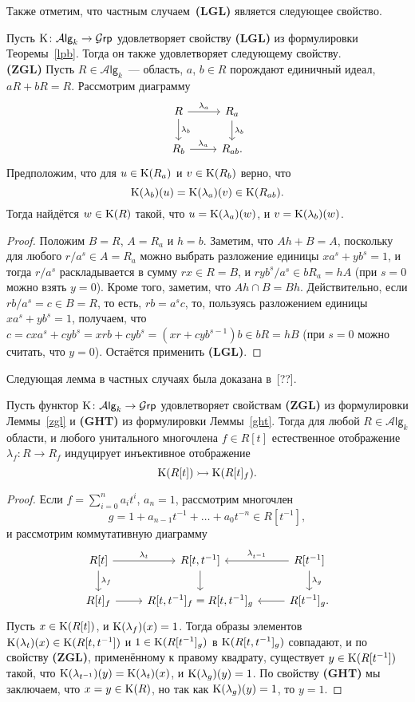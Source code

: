 \documentclass[oneside, 11pt]{amsart} \pdfoutput=1
\begin{document}
Также отметим, что частным случаем~{\bf(LGL)} является следующее свойство.
\begin{lemma}
\label{zgl}
Пусть ${\mathrm{K}}\colon\mathcal A\mathsf{lg}_k\rightarrow\mathcal G\mathsf{rp}$ удовлетворяет свойству {\bf(LGL)} из формулировки Теоремы~\ref{lpb}. Тогда он также удовлетворяет следующему свойству.\\
{\rm\bf(ZGL)}
Пусть $R\in\mathcal A\mathsf{lg}_k$~--- область, $a$, $b\in R$ порождают единичный идеал, $aR+bR=R$. Рассмотрим диаграмму
$$\begin{tikzcd}
R \ar{r}{\lambda_a} \ar{d}{\lambda_b} & R_a \ar{d}{\lambda_b}\\
R_b \ar{r}{\lambda_a} & R_{ab}.
\end{tikzcd}$$
Предположим, что для $u\in{\mathrm{K}}(R_a)$ и $v\in{\mathrm{K}}(R_b)$ верно, что $${\mathrm{K}}(\lambda_b)(u)={\mathrm{K}}(\lambda_a)(v)\in{\mathrm{K}}(R_{ab}).$$
Тогда найдётся $w\in{\mathrm{K}}(R)$ такой, что $u={\mathrm{K}}(\lambda_a)(w)$, и $v={\mathrm{K}}(\lambda_b)(w)$.
\end{lemma}
\begin{proof}
Положим $B=R$, $A=R_a$ и $h=b$. Заметим, что $Ah+B=A$, поскольку для любого $r/a^s\in A=R_a$ можно выбрать разложение единицы $xa^s+yb^s=1$, и тогда $r/a^s$ раскладывается в сумму $rx\in R=B$, и $ryb^s/a^s\in bR_a=hA$ (при $s=0$ можно взять $y=0$). Кроме того, заметим, что $Ah\cap B=Bh$. Действительно, если $rb/a^s=c\in B=R$, то есть, $rb=a^sc$, то, пользуясь разложением единицы $xa^s+yb^s=1$, получаем, что $c=cxa^s+cyb^s=xrb+cyb^s=(xr+cyb^{s-1})b\in bR=hB$ (при $s=0$ можно считать, что $y=0$). Остаётся применить {\bf(LGL)}.
\end{proof}

Следующая лемма в частных случаях была доказана в~[??].
\begin{lemma}
\label{lmp}
Пусть функтор ${\mathrm{K}}\colon\mathcal A\mathsf{lg}_k\rightarrow\mathcal G\mathsf{rp}$ удовлетворяет свойствам {\bf(ZGL)} из формулировки Леммы~\ref{zgl} и {\bf(GHT)} из формулировки Леммы~\ref{ght}. Тогда для любой $R\in\mathcal A\mathsf{lg}_k$ области, и любого унитального многочлена $f\in R[t]$ естественное отображение $\lambda_f\colon R\rightarrow R_f$ индуцирует инъективное отображение
$$
{\mathrm{K}}(R[t])\rightarrowtail{\mathrm{K}}(R[t]_f).
$$
\end{lemma}
\begin{proof}
Если $f=\sum_{i=0}^n a_it^i$, $a_n=1$, рассмотрим многочлен $$g=1+a_{n-1}t^{-1}+\ldots+a_0t^{-n}\in R[t^{-1}],$$ и рассмотрим коммутативную диаграмму
$$\begin{tikzcd}
R[t] \ar{r}{\lambda_t} \ar{d}{\lambda_f} & R[t, t^{-1}] \ar{d} & R[t^{-1}] \ar{l}[']{\lambda_{t^{-1}}} \ar{d}{\lambda_g}\\
R[t]_f \ar{r} & R[t, t^{-1}]_f = R[t, t^{-1}]_g & R[t^{-1}]_g. \ar{l}
\end{tikzcd}$$
Пусть $x\in{\mathrm{K}}(R[t])$, и ${\mathrm{K}}(\lambda_f)(x)=1$. Тогда образы элементов ${\mathrm{K}}(\lambda_t)(x)\in{\mathrm{K}}(R[t,t^{-1}])$ и $1\in{\mathrm{K}}(R[t^{-1}]_g)$ в ${\mathrm{K}}(R[t,t^{-1}]_g)$ совпадают, и по свойству {\bf(ZGL)}, применённому к правому квадрату, существует $y\in{\mathrm{K}}(R[t^{-1}])$ такой, что ${\mathrm{K}}(\lambda_{t^{-1}})(y)={\mathrm{K}}(\lambda_t)(x)$, и ${\mathrm{K}}(\lambda_{g})(y)=1$. По свойству {\bf(GHT)} мы заключаем, что $x=y\in{\mathrm{K}}(R)$, но так как ${\mathrm{K}}(\lambda_{g})(y)=1$, то $y=1$.
\end{proof}
\end{document}
